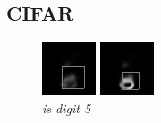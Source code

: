 \documentclass{article} %
\begin{document}
\subsection{CIFAR}

\begin{figure}[t]
\label{fig1}
\captionsetup{labelformat=empty}
  \includegraphics[width=\linewidth]{figures/5-7-4.png}
  \caption{\textit{is digit 5}}
\endminipage\hfill
{}
  \includegraphics[width=\linewidth]{figures/5-7-6.png}

\end{figure}
\end{document}
